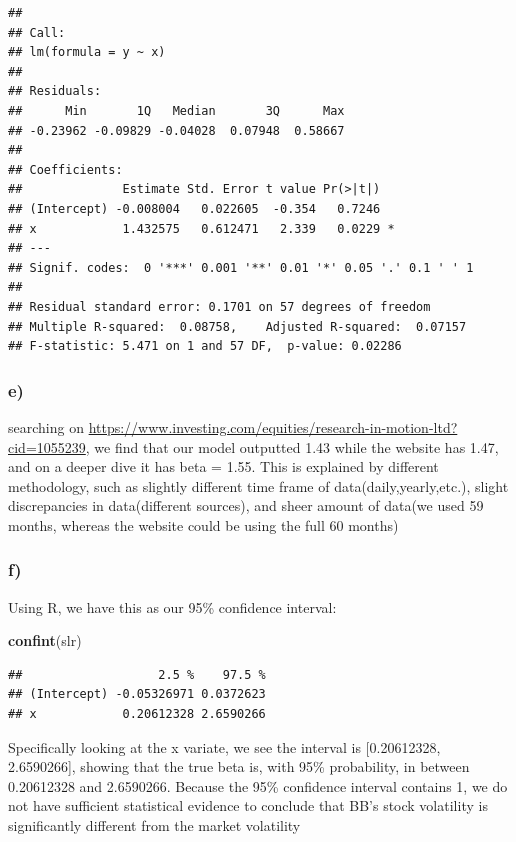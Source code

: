 \documentclass[
]{article}
\newenvironment{Shaded}{\begin{snugshade}}{\end{snugshade}}
\newcommand{\FunctionTok}[1]{\textcolor[rgb]{0.13,0.29,0.53}{\textbf{#1}}}
\newcommand{\NormalTok}[1]{#1}
\begin{document}
\begin{verbatim}
## 
## Call:
## lm(formula = y ~ x)
## 
## Residuals:
##      Min       1Q   Median       3Q      Max 
## -0.23962 -0.09829 -0.04028  0.07948  0.58667 
## 
## Coefficients:
##              Estimate Std. Error t value Pr(>|t|)  
## (Intercept) -0.008004   0.022605  -0.354   0.7246  
## x            1.432575   0.612471   2.339   0.0229 *
## ---
## Signif. codes:  0 '***' 0.001 '**' 0.01 '*' 0.05 '.' 0.1 ' ' 1
## 
## Residual standard error: 0.1701 on 57 degrees of freedom
## Multiple R-squared:  0.08758,    Adjusted R-squared:  0.07157 
## F-statistic: 5.471 on 1 and 57 DF,  p-value: 0.02286
\end{verbatim}

\subsubsection{e)}\label{e}

searching on
\url{https://www.investing.com/equities/research-in-motion-ltd?cid=1055239},
we find that our model outputted 1.43 while the website has 1.47, and on
a deeper dive it has beta = 1.55. This is explained by different
methodology, such as slightly different time frame of
data(daily,yearly,etc.), slight discrepancies in data(different
sources), and sheer amount of data(we used 59 months, whereas the
website could be using the full 60 months)

\subsubsection{f)}\label{f}

Using R, we have this as our 95\% confidence interval:

\begin{Shaded}
\begin{Highlighting}[]
\FunctionTok{confint}\NormalTok{(slr)}
\end{Highlighting}
\end{Shaded}

\begin{verbatim}
##                   2.5 %    97.5 %
## (Intercept) -0.05326971 0.0372623
## x            0.20612328 2.6590266
\end{verbatim}

Specifically looking at the x variate, we see the interval is
{[}0.20612328, 2.6590266{]}, showing that the true beta is, with 95\%
probability, in between 0.20612328 and 2.6590266. Because the 95\%
confidence interval contains 1, we do not have sufficient statistical
evidence to conclude that BB's stock volatility is significantly
different from the market volatility
\end{document}
